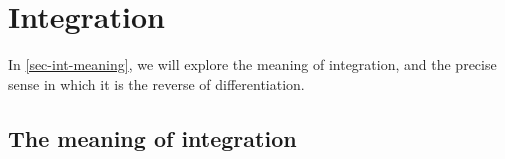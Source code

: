\documentclass[a4paper]{book}
\renewcommand{\:}{\colon}
\theoremstyle{definition}
\begin{document}


\chapter{Integration}
\label{chap-int}

In \autoref{sec-int-meaning}, we will explore the meaning of
integration, and the precise sense in which it is the reverse of
differentiation.  

\section{The meaning of integration}
\label{sec-int-meaning}
\end{document}
